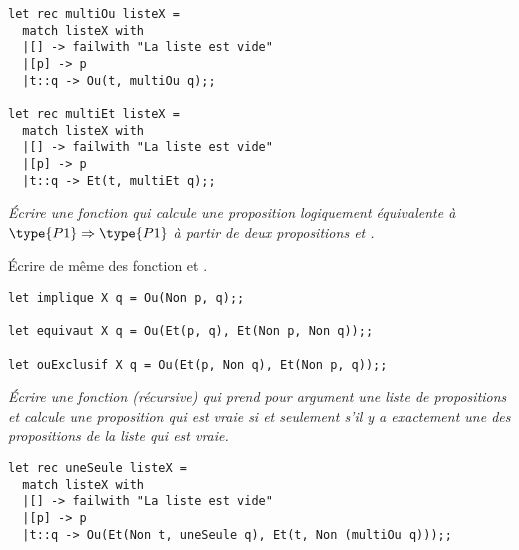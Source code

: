 \begin{Answer}
\begin{lstlisting}
let rec multiOu listeX =
  match listeX with
  |[] -> failwith "La liste est vide"
  |[p] -> p
  |t::q -> Ou(t, multiOu q);;
  
let rec multiEt listeX =
  match listeX with
  |[] -> failwith "La liste est vide"
  |[p] -> p
  |t::q -> Et(t, multiEt q);;
\end{lstlisting}
\end{Answer}
\newpage
\begin{Exercise}\it
Écrire une fonction  qui calcule une proposition logiquement équivalente à $\type{P1} \Rightarrow \type{P1}$ à partir de deux propositions  et .

Écrire de même des fonction  et .
\end{Exercise}
\begin{Answer}
\begin{lstlisting}
let implique X q = Ou(Non p, q);;

let equivaut X q = Ou(Et(p, q), Et(Non p, Non q));;

let ouExclusif X q = Ou(Et(p, Non q), Et(Non p, q));;
\end{lstlisting}
\end{Answer}
\begin{Exercise}\it
Écrire une fonction (récursive)  qui prend pour argument une liste de propositions et calcule  une proposition qui est vraie si et seulement s’il y a exactement une des propositions de la liste qui est vraie.
\end{Exercise}
\begin{Answer}
\begin{lstlisting}
let rec uneSeule listeX =
  match listeX with
  |[] -> failwith "La liste est vide"
  |[p] -> p
  |t::q -> Ou(Et(Non t, uneSeule q), Et(t, Non (multiOu q)));;
\end{lstlisting}
\end{Answer}
